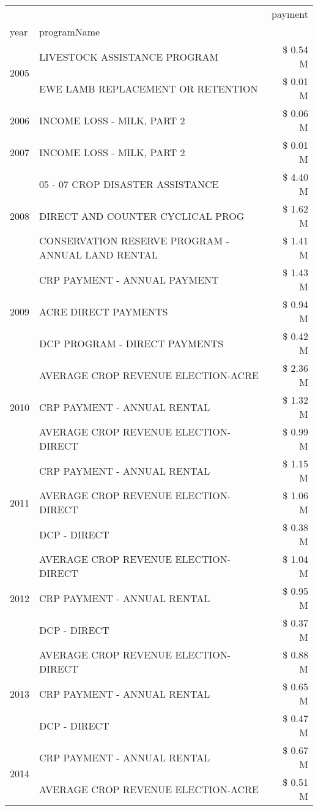 \begin{tabular}{llr}
\toprule
 &  & payment \\
year & programName &  \\
\midrule
\multirow[t]{2}{*}{2005} & LIVESTOCK ASSISTANCE PROGRAM & \$ 0.54 M \\
 & EWE LAMB REPLACEMENT OR RETENTION & \$ 0.01 M \\
\cline{1-3}
2006 & INCOME LOSS - MILK, PART 2 & \$ 0.06 M \\
\cline{1-3}
2007 & INCOME LOSS - MILK, PART 2 & \$ 0.01 M \\
\cline{1-3}
\multirow[t]{3}{*}{2008} & 05 - 07 CROP DISASTER ASSISTANCE & \$ 4.40 M \\
 & DIRECT AND COUNTER CYCLICAL PROG & \$ 1.62 M \\
 & CONSERVATION RESERVE PROGRAM - ANNUAL LAND RENTAL & \$ 1.41 M \\
\cline{1-3}
\multirow[t]{3}{*}{2009} & CRP PAYMENT - ANNUAL PAYMENT & \$ 1.43 M \\
 & ACRE DIRECT PAYMENTS & \$ 0.94 M \\
 & DCP PROGRAM - DIRECT PAYMENTS & \$ 0.42 M \\
\cline{1-3}
\multirow[t]{3}{*}{2010} & AVERAGE CROP REVENUE ELECTION-ACRE & \$ 2.36 M \\
 & CRP PAYMENT - ANNUAL RENTAL & \$ 1.32 M \\
 & AVERAGE CROP REVENUE ELECTION-DIRECT & \$ 0.99 M \\
\cline{1-3}
\multirow[t]{3}{*}{2011} & CRP PAYMENT - ANNUAL RENTAL & \$ 1.15 M \\
 & AVERAGE CROP REVENUE ELECTION-DIRECT & \$ 1.06 M \\
 & DCP - DIRECT & \$ 0.38 M \\
\cline{1-3}
\multirow[t]{3}{*}{2012} & AVERAGE CROP REVENUE ELECTION-DIRECT & \$ 1.04 M \\
 & CRP PAYMENT - ANNUAL RENTAL & \$ 0.95 M \\
 & DCP - DIRECT & \$ 0.37 M \\
\cline{1-3}
\multirow[t]{3}{*}{2013} & AVERAGE CROP REVENUE ELECTION-DIRECT & \$ 0.88 M \\
 & CRP PAYMENT - ANNUAL RENTAL & \$ 0.65 M \\
 & DCP - DIRECT & \$ 0.47 M \\
\cline{1-3}
\multirow[t]{3}{*}{2014} & CRP PAYMENT - ANNUAL RENTAL & \$ 0.67 M \\
 & AVERAGE CROP REVENUE ELECTION-ACRE & \$ 0.51 M \\

\end{tabular}
